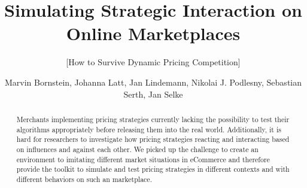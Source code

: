 \documentclass{sig-alternate-05-2015}
\begin{document}



%


\title{Simulating Strategic Interaction on Online Marketplaces}
\subtitle{[How to Survive Dynamic Pricing Competition]}



%
\author{Marvin Bornstein, Johanna Latt, Jan Lindemann, Nikolai J. Podlesny, Sebastian Serth, Jan Selke}
    

\maketitle

%
%
%
%

\begin{abstract}
Merchants implementing pricing strategies currently lacking the possibility to test their algorithms appropriately before releasing them into the real world. Additionally, it is hard for researchers to investigate how pricing strategies reacting and interacting based on influences and against each other. We picked up the challenge to create an environment to imitating different market situations in eCommerce and therefore provide the toolkit to simulate and test pricing strategies in different contexts and with different behaviors on such an marketplace.\\
\end{abstract}









\end{document}
